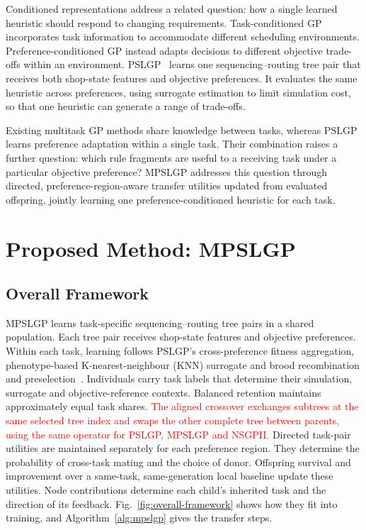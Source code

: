 \documentclass[10pt,journal]{IEEEtran}
\newcommand{\key}[1]{\textcolor{red}{#1}}
\begin{document}
Conditioned representations address a related question: how a single learned heuristic should respond to changing requirements. Task-conditioned GP~\cite{xu2026transgp} incorporates task information to accommodate different scheduling environments. Preference-conditioned GP instead adapts decisions to different objective trade-offs within an environment. PSLGP~\cite{xu2026pslgp} learns one sequencing--routing tree pair that receives both shop-state features and objective preferences. It evaluates the same heuristic across preferences, using surrogate estimation to limit simulation cost, so that one heuristic can generate a range of trade-offs.

Existing multitask GP methods share knowledge between tasks, whereas PSLGP learns preference adaptation within a single task. Their combination raises a further question: which rule fragments are useful to a receiving task under a particular objective preference? MPSLGP addresses this question through directed, preference-region-aware transfer utilities updated from evaluated offspring, jointly learning one preference-conditioned heuristic for each task.

\section{Proposed Method: MPSLGP}
\label{sec:method}
\subsection{Overall Framework}
MPSLGP learns task-specific sequencing--routing tree pairs in a shared population. Each tree pair receives shop-state features and objective preferences. Within each task, learning follows PSLGP's cross-preference fitness aggregation, phenotype-based K-nearest-neighbour (KNN) surrogate \cite{hildebrandt2015using} and brood recombination and preselection~\cite{xu2026pslgp}. Individuals carry task labels that determine their simulation, surrogate and objective-reference contexts. Balanced retention maintains approximately equal task shares. \key{The aligned crossover exchanges subtrees at the same selected tree index and swaps the other complete tree between parents, using the same operator for PSLGP, MPSLGP and NSGPII.} Directed task-pair utilities are maintained separately for each preference region. They determine the probability of cross-task mating and the choice of donor. Offspring survival and improvement over a same-task, same-generation local baseline update these utilities. Node contributions determine each child's inherited task and the direction of its feedback. Fig.~\ref{fig:overall-framework} shows how they fit into training, and Algorithm~\ref{alg:mpslgp} gives the transfer steps.
\end{document}
